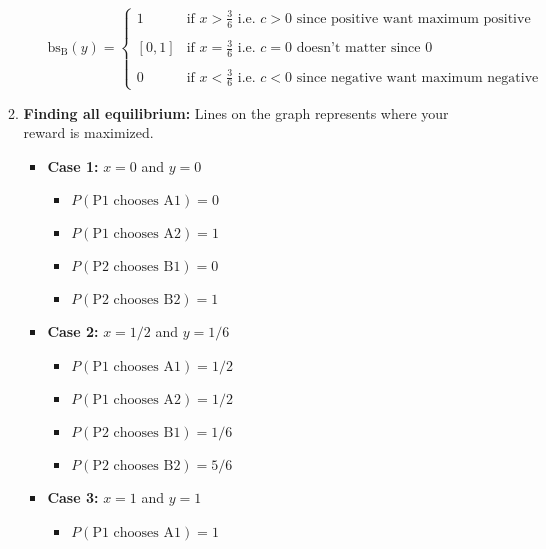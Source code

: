 \begin{example}
\begin{enumerate}
\begin{enumerate}
\begin{itemize}
\begin{equation*}
                    \text{bs}_{\text{B}}(y) = \begin{cases}
                        1 & \text{if } x > \frac{3}{6} \text{ i.e. } c > 0 \text{ since positive want maximum positive}\\
                        & \\
                        [0,1] & \text{if } x=\frac{3}{6} \text{ i.e. }c = 0 \text{ doesn't matter since 0} \\
                        & \\
                        0 & \text{if } x < \frac{3}{6} \text{ i.e. } c < 0 \text{ since negative want maximum negative}
                    \end{cases}
                \end{equation*}
            \end{itemize}
            \item \textbf{Finding all equilibrium:} Lines on the graph represents where your reward is maximized. 
            \begin{itemize}
                \item \textbf{Case 1:} $x=0$ and $y=0$
                \begin{itemize}
                    \item $P(\text{P1 chooses A1}) = 0$ 
                    \item $P(\text{P1 chooses A2}) = 1$
                    \item $P(\text{P2 chooses B1}) = 0$
                    \item $P(\text{P2 chooses B2}) = 1$
                \end{itemize}
                \item \textbf{Case 2:} $x=1/2$ and $y=1/6$
                \begin{itemize}
                    \item $P(\text{P1 chooses A1}) = 1/2$
                    \item $P(\text{P1 chooses A2}) = 1/2$
                    \item $P(\text{P2 chooses B1}) = 1/6$
                    \item $P(\text{P2 chooses B2}) = 5/6$
                \end{itemize}
                \item \textbf{Case 3:} $x=1$ and $y=1$
                \begin{itemize}
                    \item $P(\text{P1 chooses A1}) = 1$

\end{itemize}
\end{itemize}
\end{enumerate}
\end{enumerate}
\end{example}
